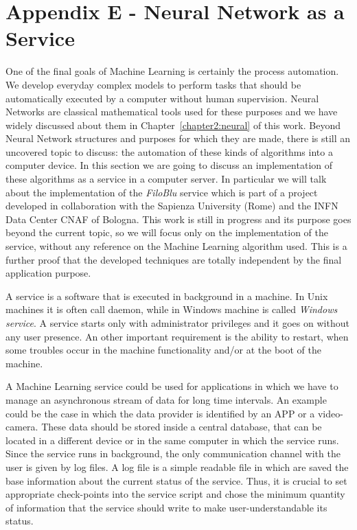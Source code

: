 \documentclass{standalone}
\begin{document}
\chapter*{Appendix E - Neural Network as a Service}

One of the final goals of Machine Learning is certainly the process automation.
We develop everyday complex models to perform tasks that should be automatically executed by a computer without human supervision.
Neural Networks are classical mathematical tools used for these purposes and we have widely discussed about them in Chapter~\ref{chapter2:neural} of this work.
Beyond Neural Network structures and purposes for which they are made, there is still an uncovered topic to discuss: the automation of these kinds of algorithms into a computer device.
In this section we are going to discuss an implementation of these algorithms as a service in a computer server.
In particular we will talk about the implementation of the \emph{FiloBlu} service which is part of a project developed in collaboration with the Sapienza University (Rome) and the INFN Data Center CNAF of Bologna.
This work is still in progress and its purpose goes beyond the current topic, so we will focus only on the implementation of the service, without any reference on the Machine Learning algorithm used.
This is a further proof that the developed techniques are totally independent by the final application purpose.

A service is a software that is executed in background in a machine.
In Unix machines it is often call \textsf{daemon}, while in Windows machine is called \emph{Windows service}.
A service starts only with administrator privileges and it goes on without any user presence.
An other important requirement is the ability to restart, when some troubles occur in the machine functionality and/or at the boot of the machine.

A Machine Learning service could be used for applications in which we have to manage an asynchronous stream of data for long time intervals.
An example could be the case in which the data provider is identified by an APP or a video-camera.
These data should be stored inside a central database, that can be located in a different device or in the same computer in which the service runs.
Since the service runs in background, the only communication channel with the user is given by log files.
A log file is a simple readable file in which are saved the base information about the current status of the service.
Thus, it is crucial to set appropriate check-points into the service script and chose the minimum quantity of information that the service should write to make user-understandable its status.
\end{document}
